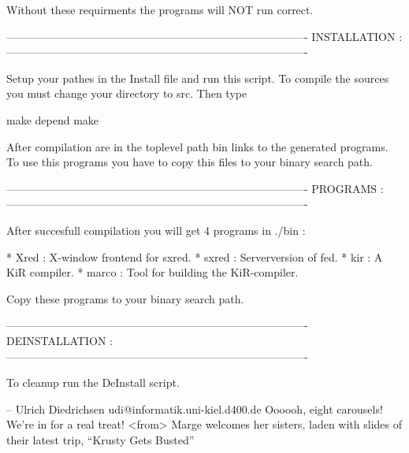 Without these requirments the programs will NOT run correct.

----------------------------------------------------------------------------------
INSTALLATION :
----------------------------------------------------------------------------------

Setup your pathes in the Install file and run this script. To compile
the sources you must change your directory to src. Then type 

 make depend
 make

After compilation are in the toplevel path bin links to the generated programs.
To use this programs you have to copy this files to your binary search path.

----------------------------------------------------------------------------------
PROGRAMS : 
----------------------------------------------------------------------------------

After succesfull compilation you will get 4 programs in ./bin :

 * Xred    : X-window frontend for sxred.
 * sxred   : Serverversion of fed.
 * kir     : A KiR compiler.
 * marco   : Tool for building the KiR-compiler.

Copy these programs to your binary search path.

----------------------------------------------------------------------------------
DEINSTALLATION :
----------------------------------------------------------------------------------

To cleanup run the DeInstall script.

-- 
Ulrich Diedrichsen      udi@informatik.uni-kiel.d400.de
Oooooh, eight carousels!  We're in for a real treat!
 <from> Marge welcomes her sisters, laden with slides of their latest trip,
        ``Krusty Gets Busted''

